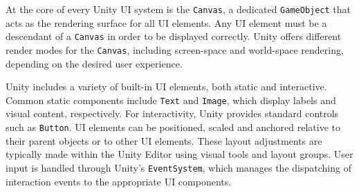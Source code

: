 At the core of every Unity UI system is the \verb|Canvas|, a dedicated \verb|GameObject| that acts as the rendering surface for all UI elements. Any UI element must be a descendant of a \verb|Canvas| in order to be displayed correctly. Unity offers different render modes for the \verb|Canvas|, including screen-space and world-space rendering, depending on the desired user experience.

Unity includes a variety of built-in UI elements, both static and interactive. Common static components include \verb|Text| and \verb|Image|, which display labels and visual content, respectively. For interactivity, Unity provides standard controls such as \verb|Button|. UI elements can be positioned, scaled and anchored relative to their parent objects or to other UI elements. These layout adjustments are typically made within the Unity Editor using visual tools and layout groups. User input is handled through Unity’s \verb|EventSystem|, which manages the dispatching of interaction events to the appropriate UI components.
